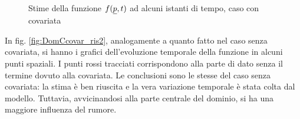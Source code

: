 \documentclass[a4paper,11pt,twoside,openright]{book}							%
\begin{document}
\begin{figure}[H]
{   }
\caption{Stime della funzione $f(\protect\underline{p},t)$ ad alcuni istanti di tempo, caso con covariata}
\label{fig:DomCcovar_ris}
\end{figure}
\newpage
In fig. \ref{fig:DomCcovar_ris2}, analogamente a quanto fatto nel caso senza covariata, si hanno i grafici dell'evoluzione temporale della funzione in alcuni punti spaziali. I punti rossi tracciati corrispondono alla parte di dato senza il termine dovuto alla covariata. Le conclusioni sono le stesse del caso senza covariata: la stima è ben riuscita e la vera variazione temporale è stata colta dal modello. Tuttavia, avvicinandosi alla parte centrale del dominio, si ha una maggiore influenza del rumore.
\end{document}
